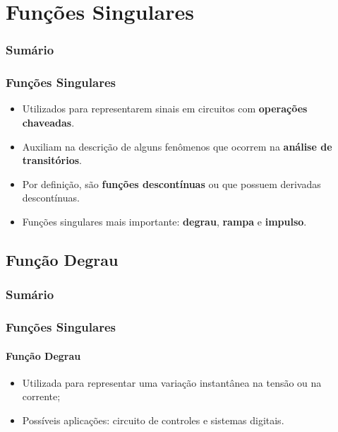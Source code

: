 \documentclass[mathserif,usenames,dvipsnames]{beamer}
\begin{document}
\section{Funções Singulares}
	\begin{frame}
	\frametitle{Sumário}
	\small
	\tableofcontents[currentsection]
\end{frame}
\begin{frame}
\frametitle{Funções Singulares}
\begin{itemize}
	\item Utilizados para representarem sinais em circuitos com \textbf{operações chaveadas}.
	\item Auxiliam na descrição de alguns fenômenos que ocorrem na \textbf{análise de transitórios}.
	\item Por definição, são \textbf{funções descontínuas} ou que possuem derivadas descontínuas.
	\item Funções singulares mais importante: \textbf{degrau}, \textbf{rampa} e \textbf{impulso}. 
\end{itemize}
\end{frame}

	
\subsection{Função Degrau}
\begin{frame}
	\frametitle{Sumário}
	\small
	\tableofcontents[currentsubsection]
\end{frame}
\begin{frame}
\frametitle{Funções Singulares}
\framesubtitle{Função Degrau}
	\begin{itemize}
		\item Utilizada para representar uma variação instantânea na tensão ou na corrente;
		\vfill
		\item Possíveis aplicações: circuito de controles e sistemas digitais.
	\end{itemize}
	
\end{frame}
\end{document}
